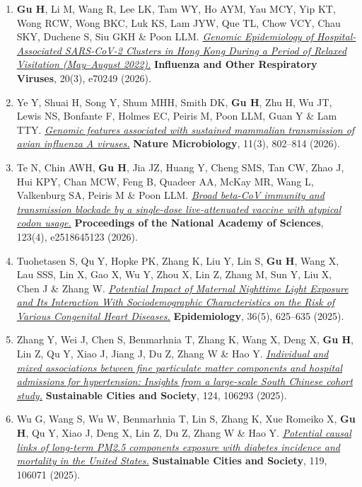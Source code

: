 \documentclass[letterpaper,10pt]{article}
\newcommand{\yr}[1]{\makebox[0pt][l]{\hspace{\linewidth}\hspace{5pt}\small\bfseries #1}\ignorespaces}
\newcommand{\journal}[1]{\textbf{#1}}
\newcounter{firstauthorcount}
\newcommand{\faitem}{\refstepcounter{firstauthorcount}\item}
\begin{document}
\begin{enumerate}[itemsep=0.5pt, parsep=0pt]
      \faitem \textbf{Gu H}, Li M, Wang R, Lee LK, Tam WY, Ho AYM, Yau MCY, Yip KT, Wong RCW, Wong BKC, Luk KS, Lam JYW, Que TL, Chow VCY, Chau SKY, Duchene S, Siu GKH \& Poon LLM. \href{https://doi.org/10.1111/irv.70249}{\textit{Genomic Epidemiology of Hospital-Associated SARS-CoV-2 Clusters in Hong Kong During a Period of Relaxed Visitation (May--August 2022).}} \journal{Influenza and Other Respiratory Viruses}, 20(3), e70249 (2026).
      \item Ye Y, Shuai H, Song Y, Shum MHH, Smith DK, \textbf{Gu H}, Zhu H, Wu JT, Lewis NS, Bonfante F, Holmes EC, Peiris M, Poon LLM, Guan Y \& Lam TTY. \href{https://doi.org/10.1038/s41564-025-02257-4}{\textit{Genomic features associated with sustained mammalian transmission of avian influenza A viruses.}} \journal{Nature Microbiology}, 11(3), 802--814 (2026).
      \item Te N, Chin AWH, \textbf{Gu H}, Jia JZ, Huang Y, Cheng SMS, Tan CW, Zhao J, Hui KPY, Chan MCW, Feng B, Quadeer AA, McKay MR, Wang L, Valkenburg SA, Peiris M \& Poon LLM. \href{https://doi.org/10.1073/pnas.2518645123}{\textit{Broad beta-CoV immunity and transmission blockade by a single-dose live-attenuated vaccine with atypical codon usage.}} \journal{Proceedings of the National Academy of Sciences}, 123(4), e2518645123 (2026).
      \item \yr{2025}Tuohetasen S, Qu Y, Hopke PK, Zhang K, Liu Y, Lin S, \textbf{Gu H}, Wang X, Lau SSS, Lin X, Gao X, Wu Y, Zhou X, Lin Z, Zhang M, Sun Y, Liu X, Chen J \& Zhang W. \href{https://doi.org/10.1097/ede.0000000000001883}{\textit{Potential Impact of Maternal Nighttime Light Exposure and Its Interaction With Sociodemographic Characteristics on the Risk of Various Congenital Heart Diseases.}} \journal{Epidemiology}, 36(5), 625--635 (2025).
      \item Zhang Y, Wei J, Chen S, Benmarhnia T, Zhang K, Wang X, Deng X, \textbf{Gu H}, Lin Z, Qu Y, Xiao J, Jiang J, Du Z, Zhang W \& Hao Y. \href{https://doi.org/10.1016/j.scs.2025.106293}{\textit{Individual and mixed associations between fine particulate matter components and hospital admissions for hypertension: Insights from a large-scale South Chinese cohort study.}} \journal{Sustainable Cities and Society}, 124, 106293 (2025).
      \item Wu G, Wang S, Wu W, Benmarhnia T, Lin S, Zhang K, Xue Romeiko X, \textbf{Gu H}, Qu Y, Xiao J, Deng X, Lin Z, Du Z, Zhang W \& Hao Y. \href{https://doi.org/10.1016/j.scs.2024.106071}{\textit{Potential causal links of long-term PM2.5 components exposure with diabetes incidence and mortality in the United States.}} \journal{Sustainable Cities and Society}, 119, 106071 (2025).

\end{enumerate}
\end{document}
